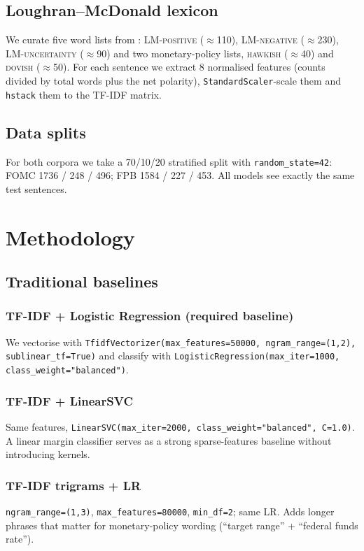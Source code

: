 \documentclass[conference, 10pt, twocolumn]{IEEEtran}
\begin{document}
\subsection{Loughran--McDonald lexicon}
\label{sec:data-lm}
We curate five word lists from \cite{loughran2011liability}:
LM-\textsc{positive} ($\approx$110), LM-\textsc{negative} ($\approx$230),
LM-\textsc{uncertainty} ($\approx$90) and two monetary-policy lists,
\textsc{hawkish} ($\approx$40) and \textsc{dovish} ($\approx$50). For each
sentence we extract 8 normalised features (counts divided by total words
plus the net polarity), \texttt{StandardScaler}-scale them and
\texttt{hstack} them to the TF-IDF matrix.

\subsection{Data splits}
\label{sec:data-splits}
For both corpora we take a 70/10/20 stratified split with
\texttt{random\_state=42}: FOMC 1736 / 248 / 496; FPB 1584 / 227 / 453. All
models see exactly the same test sentences.

\section{Methodology}
\label{sec:method}

\subsection{Traditional baselines}
\label{sec:method-tfidf}

\subsubsection{TF-IDF + Logistic Regression (required baseline)}
We vectorise with
\texttt{TfidfVectorizer(max\_features=50000, ngram\_range=(1,2), sublinear\_tf=True)}
and classify with
\texttt{LogisticRegression(max\_iter=1000, class\_weight="balanced")}.

\subsubsection{TF-IDF + LinearSVC}
Same features, \texttt{LinearSVC(max\_iter=2000, class\_weight="balanced",
C=1.0)}. A linear margin classifier serves as a strong sparse-features
baseline without introducing kernels.

\subsubsection{TF-IDF trigrams + LR}
\texttt{ngram\_range=(1,3)}, \texttt{max\_features=80000},
\texttt{min\_df=2}; same LR. Adds longer phrases that matter for
monetary-policy wording (``target range'' + ``federal funds rate'').
\end{document}
